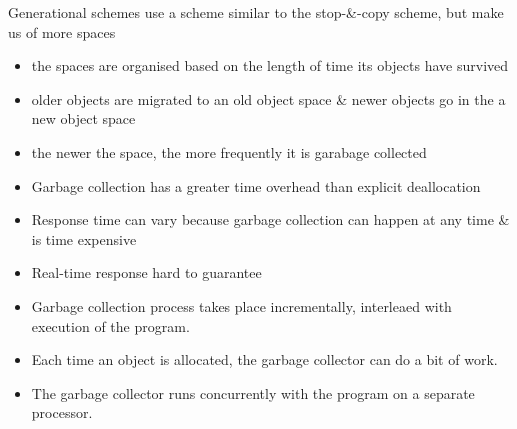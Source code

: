 Generational schemes use a scheme similar to the stop-\&-copy scheme, but make us of more 
spaces
\begin{itemize}
    \item the spaces are organised based on the length of time its objects have survived
    \item older objects are migrated to an old object space \& newer objects go in the a 
    new object space
    \item the newer the space, the more frequently it is garabage collected
\end{itemize}

\begin{itemize}
    \item Garbage collection has a greater time overhead than explicit deallocation
    \item Response time can vary because garbage collection can happen at any time 
    \& is time expensive
    \item Real-time response hard to guarantee
\end{itemize}

\begin{itemize}
    \item Garbage collection process takes place incrementally, interleaed with 
    execution of the program.
    \item Each time an object is allocated, the garbage collector can do a bit 
    of work.
\end{itemize}

\begin{itemize}
    \item The garbage collector runs concurrently with the program on a separate 
    processor.
\end{itemize}